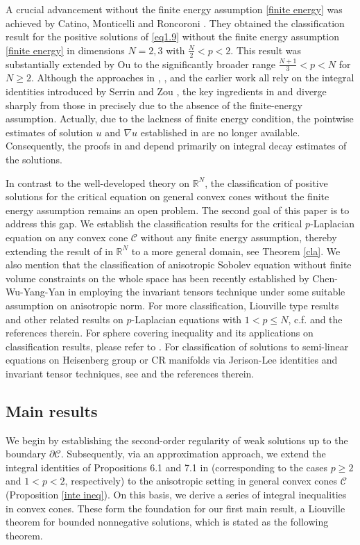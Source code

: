 \documentclass[12pt]{amsart}
\theoremstyle{definition}
\theoremstyle{remark}
\theoremstyle{conclusion}
\theoremstyle{conjecture}
\numberwithin{equation}{section}
\begin{document}
A crucial advancement without the finite energy assumption \eqref{finite energy} was achieved by Catino, Monticelli and Roncoroni \cite{CMR}. They obtained the classification result for the positive solutions of \eqref{eq1.9} without the finite energy assumption \eqref{finite energy} in dimensions $N=2,3$ with $\frac{N}{2}<p<2$. This result was substantially extended by Ou \cite{Ou} to the significantly broader range $\frac{N+1}{3}<p<N$ for $N\geq2$. Although the approaches in \cite{Ou}, \cite{CMR}, and the earlier work \cite{CFR} all rely on the integral identities introduced by Serrin and Zou \cite{SZ}, the key ingredients in \cite{Ou} and \cite{CMR} diverge sharply from those in \cite{CFR} precisely due to the absence of the finite-energy assumption. Actually, due to the lackness of finite energy condition, the pointwise estimates of solution $u$ and $\nabla u$ established in \cite{CFR} are no longer available.  Consequently, the proofs in \cite{Ou} and \cite{CMR} depend primarily on integral decay estimates of the solutions.

\smallskip

In contrast to the well-developed theory on $\mathbb{R}^N$, the classification of positive solutions for the critical equation on general convex cones without the finite energy assumption remains an open problem. The second goal of this paper is to address this gap. We establish the classification results for the critical $p$-Laplacian equation on any convex cone $\mathcal{C}$ without any finite energy assumption, thereby extending the result of \cite{Ou} in $\mathbb{R}^N$ to a more general domain, see Theorem \ref{cla}. We also mention that the classification of anisotropic Sobolev equation without finite volume constraints on the whole space has been recently established by Chen-Wu-Yang-Yan in \cite{CWYY} employing the invariant tensors technique under some suitable assumption on anisotropic norm. For more classification, Liouville type results and other related results on $p$-Laplacian equations with $1<p\leq N$, c.f. \cite{CDL,CWYY,CHN,CFR,CL1,CL2,DDGL,DGHP,DGL,DLL,Da,DFSV,DMMS,DHYZ,DWY,LWY,Sc,Ve1,Ve,Zhou} and the references therein. For sphere covering inequality and its applications on classification results, please refer to \cite{GM}. For classification of solutions to semi-linear equations on Heisenberg group or CR manifolds via Jerison-Lee identities and invariant tensor techniques, see \cite{MO,MOW} and the references therein.

\subsection{Main results}
We begin by establishing the second-order regularity of weak solutions up to the boundary $\partial\mathcal{C}$. Subsequently, via an approximation approach, we extend the integral identities of Propositions 6.1 and 7.1 in \cite{SZ} (corresponding to the cases $p\geq2$ and $1<p<2$, respectively) to the anisotropic setting in general convex cones $\mathcal{C}$ (Proposition \ref{inte ineq}). On this basis, we derive a series of integral inequalities in convex cones. These form the foundation for our first main result, a Liouville theorem for bounded nonnegative solutions, which is stated as the following theorem.
\end{document}
